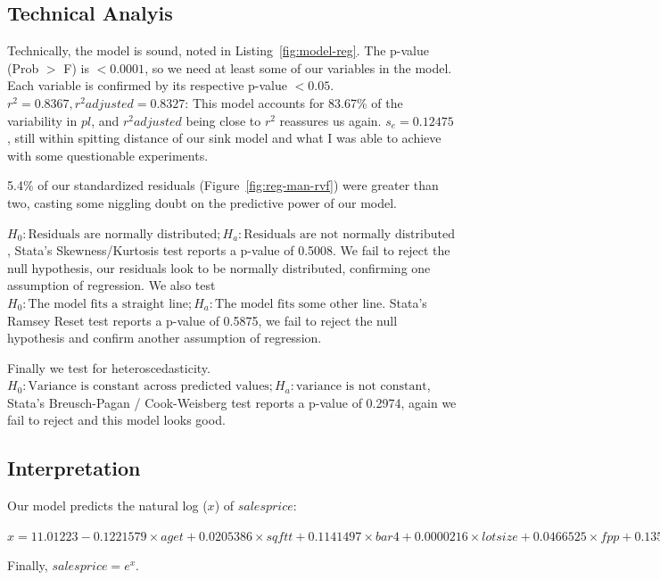 \documentclass[twocolumn,11pt]{article}
\begin{document}

\subsection*{Technical Analyis}
Technically, the model is sound, noted in Listing~\ref{fig:model-reg}.
The p-value (Prob $>$ F) is $<0.0001$, so we need at least some of our variables in the model.
Each variable is confirmed by its respective p-value $<0.05$.
$r^2 = 0.8367, r^2 adjusted = 0.8327$: This model accounts for 83.67\% of the variability in $pl$,
and $r^2 adjusted$ being close to $r^2$ reassures us again.
$s_e = 0.12475$, still within spitting distance of our sink model and what I was
able to achieve with some questionable experiments.

5.4\% of our standardized residuals (Figure~\ref{fig:reg-man-rvf}) were greater than two,
casting some niggling doubt on the predictive power of our model.

$H_0: \text{Residuals are normally distributed}; H_a: \text{Residuals are not normally distributed}$,
Stata's Skewness/Kurtosis test reports a p-value of 0.5008.
We fail to reject the null hypothesis, our residuals look to be normally distributed,
confirming one assumption of regression. We also test $H_0: \text{The model fits a straight line}; H_a: \text{The model fits some other line}$.
Stata's Ramsey Reset test reports a p-value of 0.5875, we fail to reject the null hypothesis
and confirm another assumption of regression.

Finally we test for heteroscedasticity.
$H_0: \text{Variance is constant across predicted values}; H_a: \text{variance is not constant}$,
Stata's Breusch-Pagan / Cook-Weisberg test reports a p-value of 0.2974,
again we fail to reject and this model looks good.


\subsection*{Interpretation}
Our model predicts the natural log ($x$) of $salesprice$:

\begin{math}
x = 11.01223 - 0.1221579 \times aget +
0.0205386 \times sqftt +
0.1141497 \times bar4 +
0.0000216 \times lotsize +
0.0466525 \times fpp +
0.1355746 \times garage
\end{math}

Finally, $salesprice = e^x$.
\end{document}
